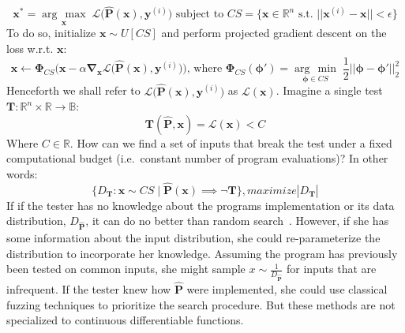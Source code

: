 \documentclass[12pt,initial,twoside,maitrise]{dms}
\newcommand{\argmax}[1]{\underset{#1}{\operatorname{arg}\,\operatorname{max}}\;}
\newcommand{\argmin}[1]{\underset{#1}{\operatorname{arg}\,\operatorname{min}}\;}
\numberwithin{equation}{section}
\numberwithin{table}{chapter}
\numberwithin{figure}{chapter}
\begin{document}
%
\begin{equation}
\mathbf{x}^* = \argmax{\mathbf{x}}\mathcal{L}\big(\mathbf{\hat P}(\mathbf{x}), \mathbf{y}^{(i)}\big) \text{ subject to } CS = \{\mathbf{x} \in \mathbb{R}^n \text{ s.t. } ||\mathbf{x}^{(i)} - \mathbf{x}|| < \epsilon\}
\end{equation}
%
 To do so, initialize $\mathbf{x} \sim U[CS]$ and perform projected gradient descent on the loss w.r.t. $\mathbf x$:
%
\begin{equation}\label{eq:projected_gd}
    \mathbf x \leftarrow \mathbf{\Phi}_{CS}\Big(\mathbf x - \alpha\mathbf\nabla_{\mathbf x} \mathcal{L}\big(\mathbf{\hat P}(\mathbf{x}), \mathbf{y}^{(i)}\big)\Big) \text{, where }
	\mathbf{\Phi}_{CS}(\mathbf \phi') = \argmin{\mathbf \phi \in CS}\frac{1}{2}||\mathbf \phi - \mathbf \phi'||^2_2
\end{equation}
%
Henceforth we shall refer to $\mathcal{L}\big(\mathbf{\hat P}(\mathbf{x}), \mathbf{y}^{(i)}\big)$ as $\mathcal{L}(\mathbf x)$. Imagine a single test $\mathbf{T}: \mathbb{R}^n \times \mathbb{R} \rightarrow \mathbb{B}$:
%
\begin{equation} \label{eq:output_constraint_example}
    \mathbf T(\mathbf{\hat P}, \mathbf{x}) = \mathcal{L}(\mathbf{x}) < C
\end{equation}
%
Where $C \in \mathbb{R}$. How can we find a set of inputs that break the test under a fixed computational budget (i.e.\ constant number of program evaluations)? In other words:
%
\begin{equation}
\{ D_\mathbf T: \mathbf x \sim CS \mid \mathbf{\hat P}(\mathbf x) \implies \neg \mathbf T \}, maximize |D_\mathbf T|
\end{equation}
%
If if the tester has no knowledge about the programs implementation or its data distribution, $D_{\mathbf{\hat P}}$, it can do no better than random search~\citep{wolpert1997no}. However, if she has some information about the input distribution, she could re-parameterize the distribution to incorporate her knowledge. Assuming the program has previously been tested on common inputs, she might sample $x \sim \frac{1}{D_{\mathbf{\hat P}}}$ for inputs that are infrequent. If the tester knew how $\mathbf{\hat P}$ were implemented, she could use classical fuzzing techniques to prioritize the search procedure. But these methods are not specialized to continuous differentiable functions.

\end{document}
